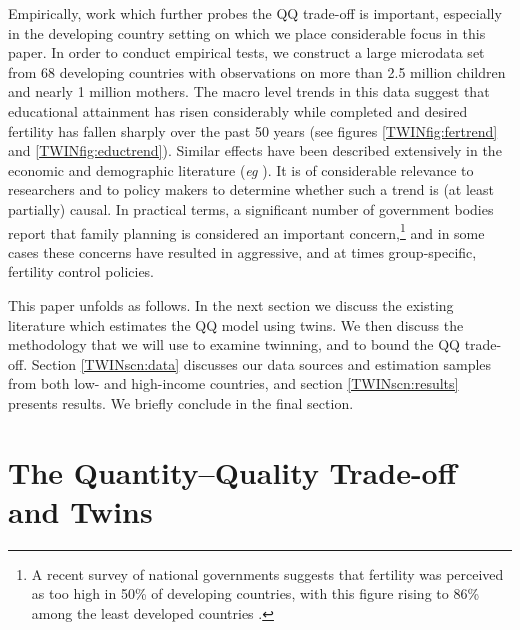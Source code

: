 Empirically, work which further probes the QQ trade-off is important,
especially in the developing country setting on which we place considerable 
focus in this paper. In order to conduct empirical tests, we construct a large 
microdata set from 68 developing countries with observations on more than 2.5 
million children and nearly 1 million mothers. The macro level trends in this 
data suggest that educational attainment has risen considerably while completed 
and desired fertility has fallen sharply over the past 50 years (see figures 
\ref{TWINfig:fertrend} and \ref{TWINfig:eductrend}). Similar effects have been 
described extensively in the economic and demographic literature (\emph{eg} 
\citet{Hanushek1992}). It is of considerable relevance to researchers and to 
policy makers to determine whether such a trend is (at least partially) causal.
In practical terms, a significant number of government bodies report that
family planning is considered an important concern,\footnote{A recent survey of 
national governments suggests that fertility was perceived as too high in 50\% 
of developing countries, with this figure rising to 86\% among the least 
developed countries \citet{UN2010}.}  and in some cases these concerns have 
resulted in aggressive, and at times group-specific, fertility control 
policies.  %

This paper unfolds as follows. In the next section we discuss the existing 
literature which estimates the QQ model using twins. We then discuss the 
methodology that we will use to examine twinning, and to bound the QQ 
trade-off.  Section \ref{TWINscn:data} discusses our data sources and 
estimation samples from both low- and high-income countries, and section 
\ref{TWINscn:results} presents results. We briefly conclude in the final 
section.

\section{The Quantity--Quality Trade-off and Twins}   \label{TWINscn:literature}

